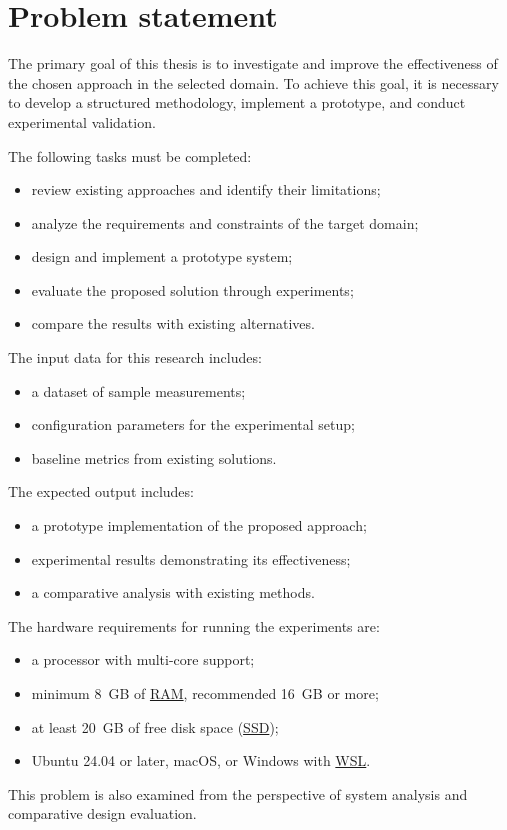 \section{Problem statement}

The primary goal of this thesis is to investigate and improve the effectiveness of the chosen approach in the selected domain.
To achieve this goal, it is necessary to develop a structured methodology, implement a prototype, and conduct experimental validation.

The following tasks must be completed:
\begin{itemize}
  \item review existing approaches and identify their limitations;
  \item analyze the requirements and constraints of the target domain;
  \item design and implement a prototype system;
  \item evaluate the proposed solution through experiments;
  \item compare the results with existing alternatives.
\end{itemize}

The input data for this research includes:
\begin{itemize}
  \item a dataset of sample measurements;
  \item configuration parameters for the experimental setup;
  \item baseline metrics from existing solutions.
\end{itemize}

The expected output includes:
\begin{itemize}
  \item a prototype implementation of the proposed approach;
  \item experimental results demonstrating its effectiveness;
  \item a comparative analysis with existing methods.
\end{itemize}

The hardware requirements for running the experiments are:
\begin{itemize}
  \item a processor with multi-core support;
  \item minimum 8~GB of \hyperlink{ram}{RAM}, recommended 16~GB or more;
  \item at least 20~GB of free disk space (\hyperlink{ssd}{SSD});
  \item Ubuntu 24.04 or later, macOS, or Windows with \hyperlink{wsl}{WSL}.
\end{itemize}

This problem is also examined from the perspective of system analysis and comparative design evaluation.

\clearpage
